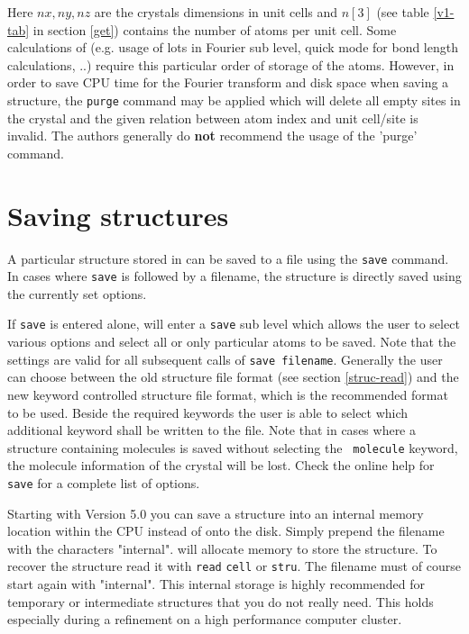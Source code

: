 Here $nx,ny,nz$ are the crystals dimensions in unit cells and $n[3]$
(see table \ref{v1-tab} in section \ref{get}) contains the number 
of atoms per unit cell.
Some calculations of \Discus (e.g.  usage of lots in Fourier
sub level, quick mode for bond length calculations, ..) require this
particular order of storage of the atoms.  However, in order to save
CPU time for the Fourier transform and disk space when saving a
structure, the {\tt purge} command may be applied which will delete
all empty sites in the crystal and the given relation between atom
index and unit cell/site is invalid.  The authors generally do {\bf
not} recommend the usage of the 'purge' command.


\section{Saving structures \label{struc-save}}

A particular structure stored in \Discus can be saved to a file
using the {\tt save} command. In cases where {\tt save} is followed
by a filename, the structure is directly saved using the currently
set options. \par

If {\tt save} is entered alone, \Discus will enter a {\tt save}
sub level which allows the user to select various options and select
all or only particular atoms to be saved. Note that the settings are
valid for all subsequent calls of {\tt save filename}. Generally the
user can choose between the old structure file format (see section
\ref{struc-read}) and the new keyword controlled structure file
format, which is the recommended format to be used. Beside the
required keywords the user is able to select which additional
keyword shall be written to the file. Note that in cases where a
structure containing molecules is saved without selecting the {\tt
molecule} keyword, the molecule information of the crystal will be
lost. Check the online help for {\tt save} for a complete list of
options.

Starting with \Discus Version 5.0 you can save a structure into
an internal memory location within the CPU instead of onto the disk.
Simply prepend the filename with the characters "internal". \Discus
will allocate memory to store  the structure. To recover the structure
read it with {\tt read} {\tt cell} or {\tt stru}. The filename must
of course start again with "internal". This internal storage is highly
recommended for temporary or intermediate structures that you do not 
really need. This holds especially during a refinement on a high 
performance computer cluster.

